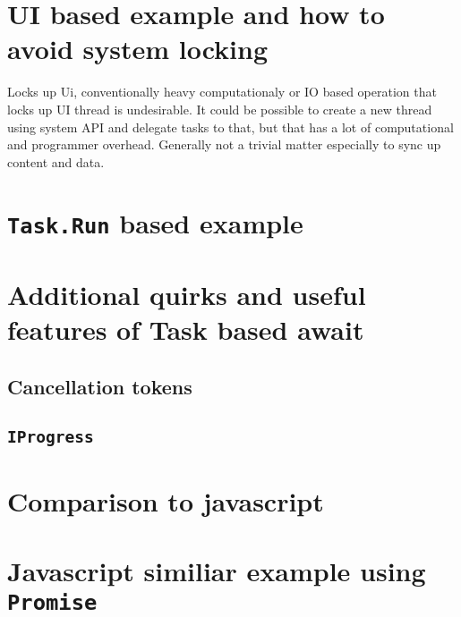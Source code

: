 \documentclass{article}
\begin{document}
\section{UI based example and how to avoid system locking}
Locks up Ui, conventionally heavy computationaly or IO based operation that locks up UI thread is undesirable.
It could be possible to create a new thread using system API and delegate tasks to that,
but that has a lot of computational and programmer overhead.
Generally not a trivial matter especially to sync up content and data.


\section{\texttt{Task.Run} based example}


\section{Additional quirks and useful features of Task based await}
\subsection{Cancellation tokens}
\subsection{\texttt{IProgress}}


\section{Comparison to javascript}

\section{Javascript similiar example using \texttt{Promise}}


% 


\end{document}
